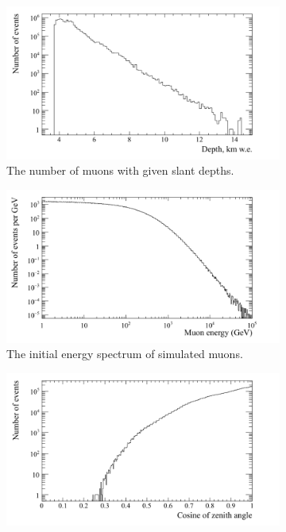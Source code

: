 \begin{figure}[h!]
  \centering
  \begin{subfigure}{0.45\textwidth}
    \centering
    \includegraphics[width=\textwidth]{DepthCan}
    \caption{The number of muons with given slant depths.}
  \end{subfigure}
  \hspace{0.08\textwidth}
  \begin{subfigure}{0.45\textwidth}
    \centering
    \includegraphics[width=\textwidth]{EnergyPerGeVCan}
    \caption{The initial energy spectrum of simulated muons.}
  \end{subfigure}
  \begin{subfigure}{0.45\textwidth}
    \centering
    \includegraphics[width=\textwidth]{ZenithCan}

\end{subfigure}
\end{figure}
